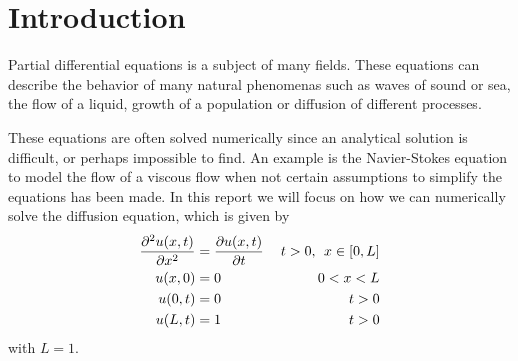 \section{Introduction}
Partial differential equations is a subject of many fields. These equations can describe the behavior of many natural phenomenas such as waves of sound or sea, the flow of a liquid, growth of a population or diffusion of different processes.

These equations are often solved numerically since an analytical solution is difficult, or perhaps impossible to find. An example is the Navier-Stokes equation to model the flow of a viscous flow when not certain assumptions to simplify the equations has been made.
In this report we will focus on how we can numerically solve the diffusion equation, which is given by
\begin{equation}\label{eq:diffusion}
\begin{aligned}
\pdv[2]{u(x,t)}{x} &= \pdv{u(x,t)}{t} &\: t>0, \:\:x\in[0,L] \\
u(x,0) &= 0  &0 < x < L\\
u(0,t) &= 0 &t>0 \\
u(L,t) &= 1&t>0
\end{aligned}
\end{equation}
with \(L = 1\).
